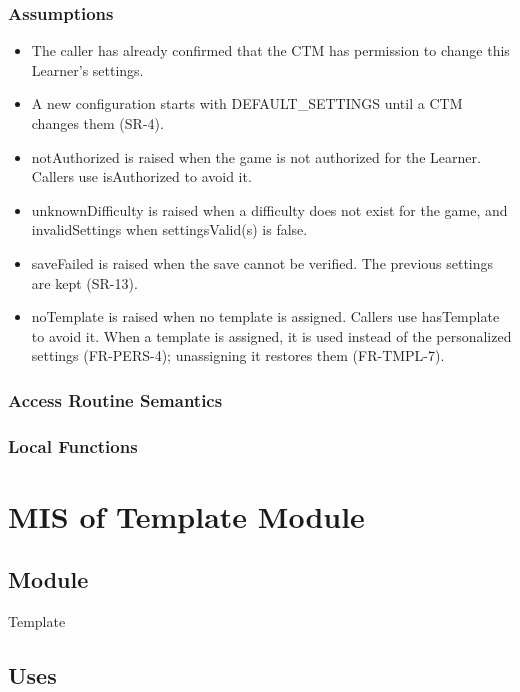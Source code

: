 \documentclass[12pt, titlepage]{article}
\begin{document}
\subsubsection{Assumptions}

\begin{itemize}
\item The caller has already confirmed that the CTM has permission to change
  this Learner's settings.
\item A new configuration starts with DEFAULT\_SETTINGS until a CTM changes
  them (SR-4).
\item notAuthorized is raised when the game is not authorized for the Learner.
  Callers use isAuthorized to avoid it.
\item unknownDifficulty is raised when a difficulty does not exist for the game,
  and invalidSettings when settingsValid(s) is false.
\item saveFailed is raised when the save cannot be verified. The previous
  settings are kept (SR-13).
\item noTemplate is raised when no template is assigned. Callers use
  hasTemplate to avoid it. When a template is assigned, it is used instead of
  the personalized settings (FR-PERS-4); unassigning it restores them
  (FR-TMPL-7).
\end{itemize}

\subsubsection{Access Routine Semantics}

\subsubsection{Local Functions}

\newpage

\section{MIS of Template Module} \label{mis:Template}

\subsection{Module}

Template

\subsection{Uses}
\end{document}
